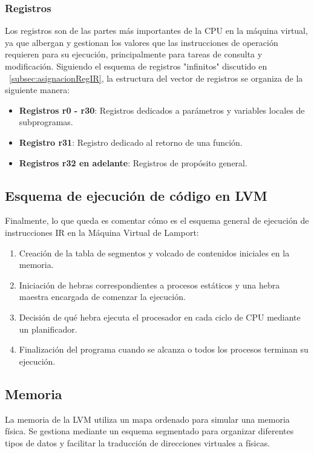 \subsubsection{Registros}\label{subsubsec:registrosLVM}
Los registros son de las partes más importantes de la CPU en la máquina virtual, ya que albergan y gestionan los valores que las instrucciones de operación requieren para su ejecución, principalmente para tareas de consulta y modificación. Siguiendo el esquema de registros "infinitos" discutido en ~\ref{subsec:asignacionRegIR}, la estructura del vector de registros se organiza de la siguiente manera:
\begin{itemize}
    \item \textbf{Registros r0 - r30}: Registros dedicados a parámetros y variables locales de subprogramas.
    \item \textbf{Registro r31}: Registro dedicado al retorno de una función.
    \item \textbf{Registros r32 en adelante}: Registros de propósito general.
\end{itemize}

\subsection{Esquema de ejecución de código en LVM}
Finalmente, lo que queda es comentar cómo es el esquema general de ejecución de instrucciones IR en la Máquina Virtual de Lamport:

\begin{enumerate}
    \item Creación de la tabla de segmentos y volcado de contenidos iniciales en la memoria.
    \item Iniciación de hebras correspondientes a procesos estáticos y una hebra maestra encargada de comenzar la ejecución.
    \item Decisión de qué hebra ejecuta el procesador en cada ciclo de CPU mediante un planificador.
    \item Finalización del programa cuando se alcanza  o todos los procesos terminan su ejecución.
\end{enumerate}

\subsection{Memoria}\label{subsec:memoryLVM}
La memoria de la LVM utiliza un mapa ordenado para simular una memoria física. Se gestiona mediante un esquema segmentado para organizar diferentes tipos de datos y facilitar la traducción de direcciones virtuales a físicas.

